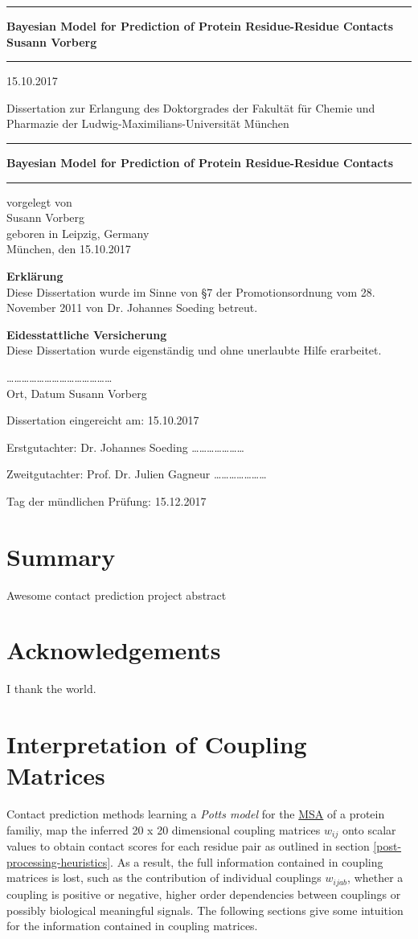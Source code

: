 \documentclass[12pt,a4paper,twoside]{book}
\newcommand{\wijab}{w_{ijab}}
\newcommand{\LMUCover}[3]{
    \thispagestyle{empty}
    {\parindent0cm \rule{\linewidth}{.7ex}}
    
    \begin{flushright}
      \vspace*{\stretch{1}}
      \sffamily\bfseries\Huge
      #1\\
      \vspace*{\stretch{1}}
      \sffamily\bfseries\large
      #2
      \vspace*{\stretch{1}}
    \end{flushright}
  
    \rule{\linewidth}{.7ex}
    \vspace*{\stretch{5}}
    \vspace*{\stretch{1}}
    
    \begin{center}\sffamily\LARGE{#3}\end{center}
}
\newcommand{\LMUTitlePage}[4]{
    \thispagestyle{empty}
    \vspace*{\stretch{1}}
    
    \begin{center}
      \Large Dissertation zur Erlangung des Doktorgrades der Fakultät für Chemie und Pharmazie der Ludwig-Maximilians-Universität München
    \end{center}
    
    \vspace*{\stretch{1}}
    {\parindent0cm \rule{\linewidth}{.7ex}}
    
    \begin{flushright}
      \vspace*{\stretch{1}}
      \sffamily\bfseries\Huge
      #1\\
      \vspace*{\stretch{1}}
    \end{flushright}
  
    \rule{\linewidth}{.7ex}

    \vspace*{\stretch{3}}
    \begin{center}
      \Large vorgelegt von\\
      \Large #2\\
      \Large geboren in #3\\
      \vspace*{\stretch{2}}
      \Large München, den #4
    \end{center}
}
\newcommand{\LMUErklaerung}[5]{
    \thispagestyle{empty}
    \begin{flushleft}
      \large \textbf{Erklärung} \\[1mm]
      \large Diese Dissertation wurde im Sinne von §7 der Promotionsordnung vom 28. November 2011 von #2 betreut.
      \bigskip
  
      \large \textbf{Eidesstattliche Versicherung}\\[1mm]
      \large Diese Dissertation wurde eigenständig und ohne unerlaubte Hilfe erarbeitet.
      \vspace{5em}
  
      \dots\dots\dots   \dots\dots\dots \hfill \dots\dots\dots\dots\dots\dots\dots\dots\\
      \large Ort, Datum \hfill #1
      \vfill
  
  
      \large Dissertation eingereicht am: \hfill #4
      \bigskip
    
      \large Erstgutachter:  #2 \hfill \dots\dots\dots\dots\dots\dots\dots
      \bigskip
    
      \large Zweitgutachter: #3 \hfill \dots\dots\dots\dots\dots\dots\dots
      \bigskip
    
      \large Tag der mündlichen Prüfung: \hfill #5
    \end{flushleft}
}
\theoremstyle{definition}
\theoremstyle{definition}
\theoremstyle{remark}
\begin{document}
\frontmatter

\LMUCover
	{Bayesian Model for Prediction of Protein Residue-Residue Contacts}
	{Susann Vorberg}
	{15.10.2017}

\newpage
\thispagestyle{empty}
\cleardoublepage

\LMUTitlePage
	{Bayesian Model for Prediction of Protein Residue-Residue Contacts}
	{Susann Vorberg}
	{Leipzig, Germany}
	{15.10.2017}

\newpage
\thispagestyle{empty}
\cleardoublepage

\LMUErklaerung
	{Susann Vorberg}
	{Dr. Johannes Soeding}
	{Prof. Dr. Julien Gagneur}
	{15.10.2017}
	{15.12.2017}

\newpage
\thispagestyle{empty}
\cleardoublepage
\frontmatter\setcounter{page}{1}

\chapter*{Summary}\label{summary}

Awesome contact prediction project abstract

\chapter*{Acknowledgements}\label{acknowledgements}

I thank the world.

\tableofcontents
{}

\mainmatter \setcounter{page}{1}

\chapter{Interpretation of Coupling
Matrices}\label{interpreting-coupling-matrices}

Contact prediction methods learning a \emph{Potts model} for the
\protect\hyperlink{abbrev}{MSA} of a protein familiy, map the inferred
20 x 20 dimensional coupling matrices \(w_{ij}\) onto scalar values to
obtain contact scores for each residue pair as outlined in section
\ref{post-processing-heuristics}. As a result, the full information
contained in coupling matrices is lost, such as the contribution of
individual couplings \(\wijab\), whether a coupling is positive or
negative, higher order dependencies between couplings or possibly
biological meaningful signals. The following sections give some
intuition for the information contained in coupling matrices.
\end{document}
